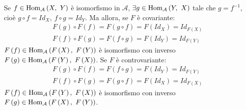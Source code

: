 \begin{demonstration}
	Se $f\in \mathrm{Hom}_{\mathcal{A}}\left(X,\ Y\right)$ è isomorfismo in $\mathcal{A}$, $\exists g\in\mathrm{Hom}_{\mathcal{A}}\left(Y,\ X\right)$ tale che $g=f^{-1}$, cioè $g\circ f=Id_X,\ f\circ g=Id_Y$. Ma allora, se $F$ è covariante:
	\begin{gather*}
		F\left(g\right)\circ F\left(f\right)=F\left(g\circ f\right)=F\left(Id_X\right)=Id_{F\left(X\right)}\\
		F\left(f\right)\circ F\left(g\right)=F\left(f\circ g\right)=F\left(Id_Y\right)=Id_{F\left(Y\right)}
	\end{gather*}
$F\left(f\right)\in\mathrm{Hom}_{\mathcal{A}}\left(F\left(X\right),\ F\left(Y\right)\right)$ è isomorfismo con inverso $F\left(g\right)\in\mathrm{Hom}_{\mathcal{A}}\left(F\left(Y\right),\ F\left(X\right)\right)$. Se $F$ è controvariante:
\begin{gather*}
	F\left(g\right)\circ F\left(f\right)=F\left(f\circ g\right)=F\left(Id_Y\right)=Id_{F\left(Y\right)}\\
	F\left(f\right)\circ F\left(g\right)=F\left(g\circ f\right)=F\left(Id_X\right)=Id_{F\left(X\right)}
\end{gather*}
$F\left(f\right)\in\mathrm{Hom}_{\mathcal{A}}\left(F\left(Y\right),\ F\left(X\right)\right)$ è isomorfismo con inverso $F\left(g\right)\in\mathrm{Hom}_{\mathcal{A}}\left(F\left(X\right),\ F\left(Y\right)\right)$.
\end{demonstration}
